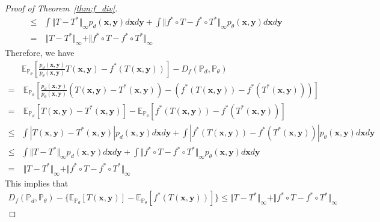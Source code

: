 \begin{proof}[Proof of Theorem~\ref{thm:f_div}]
\begin{align*}
\leq & \int\Vert T-T^{*}\Vert_{\infty}p_{d}\left(\boldsymbol{x,y}\right)d\boldsymbol{x}d\boldsymbol{y}+\int\Vert f^{*}\circ T-f^{*}\circ T^{*}\Vert_{\infty}p_{\theta}\left(\boldsymbol{x,y}\right)d\boldsymbol{x}d\boldsymbol{y}\\
= & \ \Vert T-T^{*}\Vert_{\infty}+\Vert f^{*}\circ T-f^{*}\circ T^{*}\Vert_{\infty}
\end{align*}
Therefore, we have
\begin{align*}
 & \mathbb{E}_{\mathbb{P}_{\theta}}\left[\frac{p_{d}\left(\boldsymbol{x},\boldsymbol{y}\right)}{p_{\theta}\left(\boldsymbol{x},\boldsymbol{y}\right)}T\left(\boldsymbol{x},\boldsymbol{y}\right)-f^{*}\left(T\left(\boldsymbol{x},\boldsymbol{y}\right)\right)\right]-D_{f}\left(\mathbb{P}_{d},\mathbb{P}_{\theta}\right)\\
= & \ \mathbb{E}_{\mathbb{P}_{\theta}}\left[\frac{p_{d}\left(\boldsymbol{x},\boldsymbol{y}\right)}{p_{\theta}\left(\boldsymbol{x},\boldsymbol{y}\right)}\left(T\left(\boldsymbol{x},\boldsymbol{y}\right)-T^{*}\left(\boldsymbol{x},\boldsymbol{y}\right)\right)-\left(f^{*}\left(T\left(\boldsymbol{x},\boldsymbol{y}\right)\right)-f^{*}\left(T^{*}\left(\boldsymbol{x},\boldsymbol{y}\right)\right)\right)\right]\\
= & \ \mathbb{E}_{\mathbb{P}_{d}}\left[T\left(\boldsymbol{x},\boldsymbol{y}\right)-T^{*}\left(\boldsymbol{x},\boldsymbol{y}\right)\right]-\mathbb{E}_{\mathbb{P}_{\theta}}\left[f^{*}\left(T\left(\boldsymbol{x},\boldsymbol{y}\right)\right)-f^{*}\left(T^{*}\left(\boldsymbol{x},\boldsymbol{y}\right)\right)\right]\\
\leq & \int\left|T\left(\boldsymbol{x},\boldsymbol{y}\right)-T^{*}\left(\boldsymbol{x},\boldsymbol{y}\right)\right|p_{d}\left(\boldsymbol{x,y}\right)d\boldsymbol{x}d\boldsymbol{y}+\int\left|f^{*}\left(T\left(\boldsymbol{x},\boldsymbol{y}\right)\right)-f^{*}\left(T^{*}\left(\boldsymbol{x},\boldsymbol{y}\right)\right)\right|p_{\theta}\left(\boldsymbol{x,y}\right)d\boldsymbol{x}d\boldsymbol{y}\\
\leq & \int\Vert T-T^{*}\Vert_{\infty}p_{d}\left(\boldsymbol{x,y}\right)d\boldsymbol{x}d\boldsymbol{y}+\int\Vert f^{*}\circ T-f^{*}\circ T^{*}\Vert_{\infty}p_{\theta}\left(\boldsymbol{x,y}\right)d\boldsymbol{x}d\boldsymbol{y}\\
= & \ \Vert T-T^{*}\Vert_{\infty}+\Vert f^{*}\circ T-f^{*}\circ T^{*}\Vert_{\infty}
\end{align*}
This implies that
\begin{align*} D_{f}\left(\mathbb{P}_{d},\mathbb{P}_{\theta}\right)-\{\mathbb{E}_{\mathbb{P}_{d}}\left[T\left(\boldsymbol{x},\boldsymbol{y}\right)\right]-\mathbb{E}_{\mathbb{P}_{\theta}}\left[f^{*}\left(T\left(\boldsymbol{x},\boldsymbol{y}\right)\right)\right]\} \leq  \Vert T-T^{*}\Vert_{\infty}+\Vert f^{*}\circ T-f^{*}\circ T^{*}\Vert_{\infty}

\end{align*}
\end{proof}
